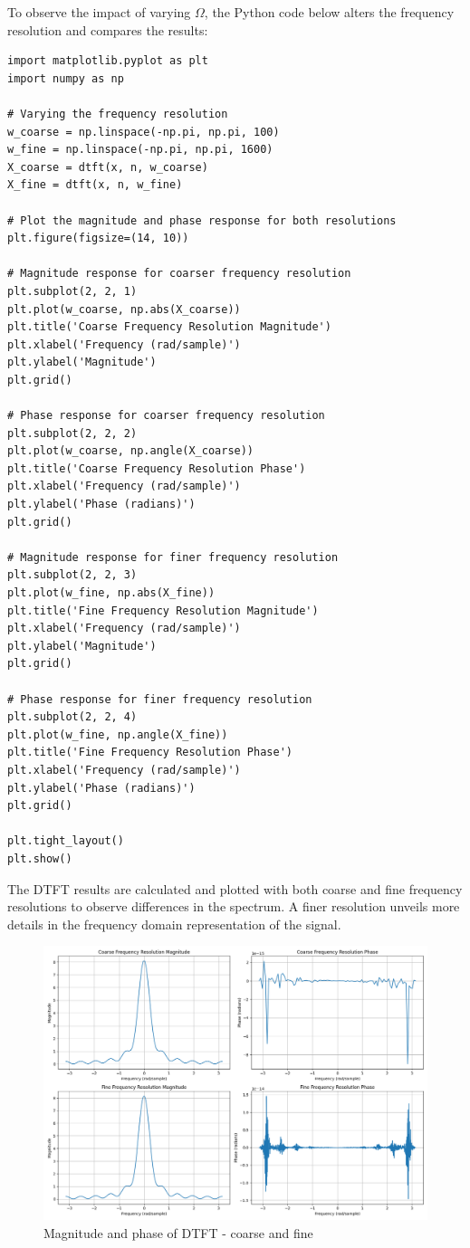 
\item[(c)]
To observe the impact of varying $\Omega$, the Python code below alters the frequency resolution and compares the results:

\begin{verbatim}
import matplotlib.pyplot as plt
import numpy as np

# Varying the frequency resolution
w_coarse = np.linspace(-np.pi, np.pi, 100)
w_fine = np.linspace(-np.pi, np.pi, 1600)
X_coarse = dtft(x, n, w_coarse)
X_fine = dtft(x, n, w_fine)

# Plot the magnitude and phase response for both resolutions
plt.figure(figsize=(14, 10))

# Magnitude response for coarser frequency resolution
plt.subplot(2, 2, 1)
plt.plot(w_coarse, np.abs(X_coarse))
plt.title('Coarse Frequency Resolution Magnitude')
plt.xlabel('Frequency (rad/sample)')
plt.ylabel('Magnitude')
plt.grid()

# Phase response for coarser frequency resolution
plt.subplot(2, 2, 2)
plt.plot(w_coarse, np.angle(X_coarse))
plt.title('Coarse Frequency Resolution Phase')
plt.xlabel('Frequency (rad/sample)')
plt.ylabel('Phase (radians)')
plt.grid()

# Magnitude response for finer frequency resolution
plt.subplot(2, 2, 3)
plt.plot(w_fine, np.abs(X_fine))
plt.title('Fine Frequency Resolution Magnitude')
plt.xlabel('Frequency (rad/sample)')
plt.ylabel('Magnitude')
plt.grid()

# Phase response for finer frequency resolution
plt.subplot(2, 2, 4)
plt.plot(w_fine, np.angle(X_fine))
plt.title('Fine Frequency Resolution Phase')
plt.xlabel('Frequency (rad/sample)')
plt.ylabel('Phase (radians)')
plt.grid()

plt.tight_layout()
plt.show()
\end{verbatim}

The DTFT results are calculated and plotted with both coarse and fine frequency resolutions to observe differences in the spectrum.
A finer resolution unveils more details in the frequency domain representation of the signal.

\begin{figure}[h]
\centering
\includegraphics[width=\textwidth]{fig/ex4_c_plot}
\caption{Magnitude and phase of DTFT - coarse and fine}
\label{fig:ex4_c_plot}
\end{figure}

